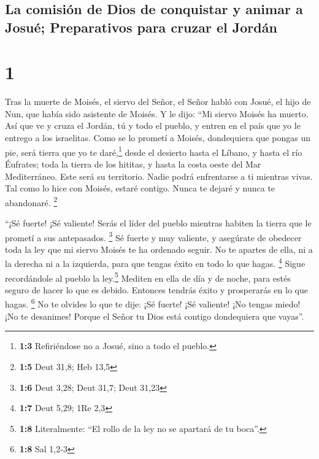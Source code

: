 \hypertarget{la-comisiuxf3n-de-dios-de-conquistar-y-animar-a-josuuxe9-preparativos-para-cruzar-el-jorduxe1n}{%
\subsection{La comisión de Dios de conquistar y animar a Josué;
Preparativos para cruzar el
Jordán}\label{la-comisiuxf3n-de-dios-de-conquistar-y-animar-a-josuuxe9-preparativos-para-cruzar-el-jorduxe1n}}

\hypertarget{section}{%
\section{1}\label{section}}

 Tras la muerte de Moisés, el siervo del Señor, el Señor
habló con Josué, el hijo de Nun, que había sido asistente de Moisés. Y
le dijo:  ``Mi siervo Moisés ha muerto. Así que ve y cruza
el Jordán, tú y todo el pueblo, y entren en el país que yo le entrego a
los israelitas.  Como se lo prometí a Moisés, dondequiera
que pongas un pie, será tierra que yo te daré,\footnote{\textbf{1:3}
  Refiriéndose no a Josué, sino a todo el pueblo.}  desde
el desierto hasta el Líbano, y hasta el río Éufrates; toda la tierra de
los hititas, y hasta la costa oeste del Mar Mediterráneo. Este será su
territorio.  Nadie podrá enfrentarse a ti mientras vivas.
Tal como lo hice con Moisés, estaré contigo. Nunca te dejaré y nunca te
abandonaré. \footnote{\textbf{1:5} Deut 31,8; Heb 13,5}

 ``¡Sé fuerte! ¡Sé valiente! Serás el líder del pueblo
mientras habiten la tierra que le prometí a sus antepasados. \footnote{\textbf{1:6}
  Deut 3,28; Deut 31,7; Deut 31,23}  Sé fuerte y muy
valiente, y asegúrate de obedecer toda la ley que mi siervo Moisés te ha
ordenado seguir. No te apartes de ella, ni a la derecha ni a la
izquierda, para que tengas éxito en todo lo que hagas. \footnote{\textbf{1:7}
  Deut 5,29; 1Re 2,3}  Sigue recordándole al pueblo la
ley.\footnote{\textbf{1:8} Literalmente: ``El rollo de la ley no se
  apartará de tu boca''.} Mediten en ella de día y de noche, para estés
seguro de hacer lo que es debido. Entonces tendrás éxito y prosperarás
en lo que hagas. \footnote{\textbf{1:8} Sal 1,2-3}  No te
olvides lo que te dije: ¡Sé fuerte! ¡Sé valiente! ¡No tengas miedo! ¡No
te desanimes! Porque el Señor tu Dios está contigo dondequiera que
vayas''.

